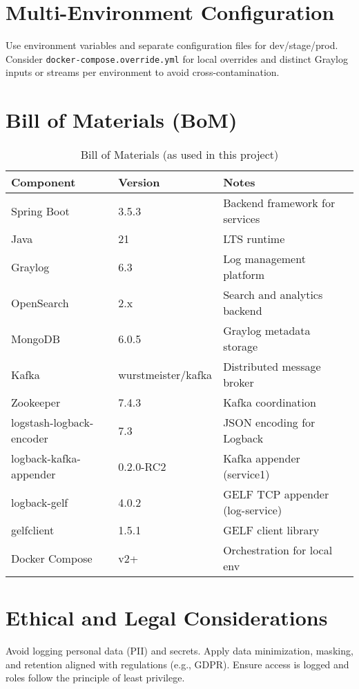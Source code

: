 \documentclass[12pt,a4paper]{report}
\begin{document}
\chapter{Multi-Environment Configuration}
Use environment variables and separate configuration files for dev/stage/prod. Consider \texttt{docker-compose.override.yml} for local overrides and distinct Graylog inputs or streams per environment to avoid cross-contamination.

\chapter{Bill of Materials (BoM)}
\begin{table}[H]
\centering
\begin{tabular}{llp{7cm}}
\toprule
\textbf{Component} & \textbf{Version} & \textbf{Notes} \\
\midrule
Spring Boot & 3.5.3 & Backend framework for services \\
Java & 21 & LTS runtime \\
Graylog & 6.3 & Log management platform \\
OpenSearch & 2.x & Search and analytics backend \\
MongoDB & 6.0.5 & Graylog metadata storage \\
Kafka & wurstmeister/kafka & Distributed message broker \\
Zookeeper & 7.4.3 & Kafka coordination \\
logstash-logback-encoder & 7.3 & JSON encoding for Logback \\
logback-kafka-appender & 0.2.0-RC2 & Kafka appender (service1) \\
logback-gelf & 4.0.2 & GELF TCP appender (log-service) \\
gelfclient & 1.5.1 & GELF client library \\
Docker Compose & v2+ & Orchestration for local env \\
\bottomrule
\end{tabular}
\caption{Bill of Materials (as used in this project)}
\end{table}

\chapter{Ethical and Legal Considerations}
Avoid logging personal data (PII) and secrets. Apply data minimization, masking, and retention aligned with regulations (e.g., GDPR). Ensure access is logged and roles follow the principle of least privilege.
\end{document}
